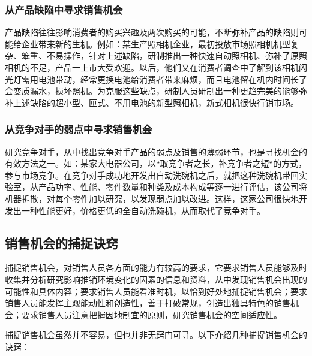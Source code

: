     \subsubsection {从产品缺陷中寻求销售机会}

    产品缺陷往往影响消费者的购买兴趣及两次购买的可能，不断弥补产品的缺陷则可能给企业带来新的生机。例如：某生产照相机企业，最初投放市场照相机机型复杂、笨重、不易操作，针对上述缺陷，研制推出一种快速自动照相机、弥补了原照相机的不足，产品一上市大受欢迎。以后，他们又在消费者调查中了解到该相机闪光灯需用电池带动，经常更换电池给消费者带来麻烦，而且电池留在机内时间长了会变质漏水，损坏照机。为克服这些缺点，研制人员研制出一种更趋完美的能够弥补上述缺陷的超小型、匣式、不用电池的新型照相机，新式相机很快行销市场。

    \subsubsection {从竞争对手的弱点中寻求销售机会}

    研究竞争对手，从中找出竞争对手产品的弱点及销售的薄弱环节，也是寻找机会的有效方法之一。如：某家大电器公司，以“取竞争者之长，补竞争者之短“的方式，参与市场竞争。在竞争对手成功地开发出自动洗碗机之后，就把这种洗碗机带回实验室，从产品功率、性能、零件数量和种类及成本构成等逐一进行评估，该公司将机器拆散，对每个零件加以研究，以发现弱点加以改进。这样，这家公司很快地开发出一种性能更好，价格更低的全自动洗碗机，从而取代了竞争对手。

\subsection {销售机会的捕捉诀窍}

    捕捉销售机会，对销售人员各方面的能力有较高的要求，它要求销售人员能够及时收集并分析研究影响推销环境变化的因素的信息和资料，从中发现销售机会出现的可能性和具体内容；要求销售人员能看准时机，以恰到好处地捕捉销售机会；要求销售人员能发挥主观能动性和创造性，善于打破常规，创造出独具特色的销售机会；要求销售人员注意把握因地制宜的原则，研究销售机会的空间适应性。

    捕捉销售机会虽然并不容易，但也并非无窍门可寻。以下介绍几种捕捉销售机会的诀窍：

